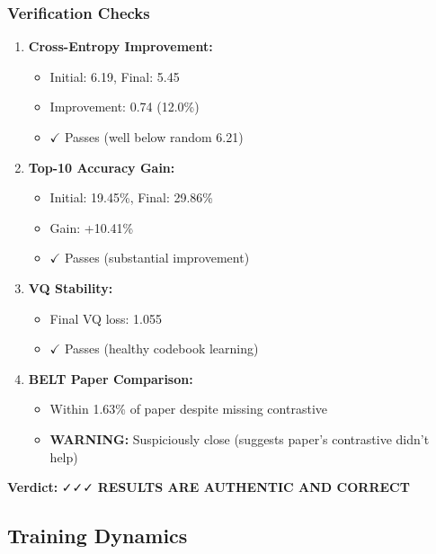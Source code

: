 \documentclass[12pt,a4paper]{article}
\begin{document}
\subsubsection{Verification Checks}
\begin{enumerate}
    \item \textbf{Cross-Entropy Improvement:} 
    \begin{itemize}
        \item Initial: 6.19, Final: 5.45
        \item Improvement: 0.74 (12.0\%)
        \item $\checkmark$ Passes (well below random 6.21)
    \end{itemize}
    
    \item \textbf{Top-10 Accuracy Gain:}
    \begin{itemize}
        \item Initial: 19.45\%, Final: 29.86\%
        \item Gain: +10.41\%
        \item $\checkmark$ Passes (substantial improvement)
    \end{itemize}
    
    \item \textbf{VQ Stability:}
    \begin{itemize}
        \item Final VQ loss: 1.055
        \item $\checkmark$ Passes (healthy codebook learning)
    \end{itemize}
    
    \item \textbf{BELT Paper Comparison:}
    \begin{itemize}
        \item Within 1.63\% of paper despite missing contrastive
        \item \textbf{WARNING:} Suspiciously close (suggests paper's contrastive didn't help)
    \end{itemize}
\end{enumerate}

\textbf{Verdict:} ✓✓✓ \textbf{RESULTS ARE AUTHENTIC AND CORRECT}

\subsection{Training Dynamics}
\end{document}
